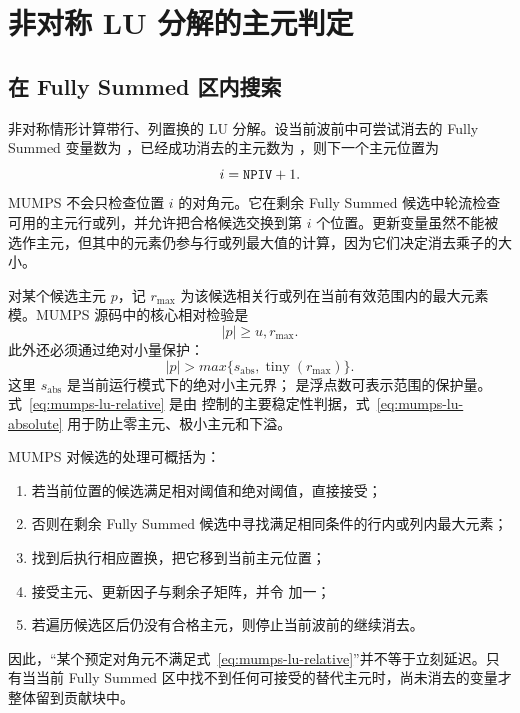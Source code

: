 \section{非对称 LU 分解的主元判定}

\subsection{在 Fully Summed 区内搜索}

非对称情形计算带行、列置换的 LU 分解。设当前波前中可尝试消去的 Fully Summed 变量数为 ，已经成功消去的主元数为 ，则下一个主元位置为
\[
i=\texttt{NPIV}+1.
\]
MUMPS 不会只检查位置 $i$ 的对角元。它在剩余 Fully Summed 候选中轮流检查可用的主元行或列，并允许把合格候选交换到第 $i$ 个位置。更新变量虽然不能被选作主元，但其中的元素仍参与行或列最大值的计算，因为它们决定消去乘子的大小。

对某个候选主元 $p$，记 $r_{\max}$ 为该候选相关行或列在当前有效范围内的最大元素模。MUMPS 源码中的核心相对检验是
\begin{equation}
|p|\ge u,r_{\max}.
\label{eq:mumps-lu-relative}
\end{equation}
此外还必须通过绝对小量保护：
\begin{equation}
|p|>max\{s_{\mathrm{abs}},\operatorname{tiny}(r_{\max})\}.
\label{eq:mumps-lu-absolute}
\end{equation}
这里 $s_{\mathrm{abs}}$ 是当前运行模式下的绝对小主元界； 是浮点数可表示范围的保护量。式~\eqref{eq:mumps-lu-relative} 是由  控制的主要稳定性判据，式~\eqref{eq:mumps-lu-absolute} 用于防止零主元、极小主元和下溢。

MUMPS 对候选的处理可概括为：

\begin{enumerate}
  \item 若当前位置的候选满足相对阈值和绝对阈值，直接接受；
  \item 否则在剩余 Fully Summed 候选中寻找满足相同条件的行内或列内最大元素；
  \item 找到后执行相应置换，把它移到当前主元位置；
  \item 接受主元、更新因子与剩余子矩阵，并令  加一；
  \item 若遍历候选区后仍没有合格主元，则停止当前波前的继续消去。
\end{enumerate}

因此，“某个预定对角元不满足式~\eqref{eq:mumps-lu-relative}”并不等于立刻延迟。只有当当前 Fully Summed 区中找不到任何可接受的替代主元时，尚未消去的变量才整体留到贡献块中。

